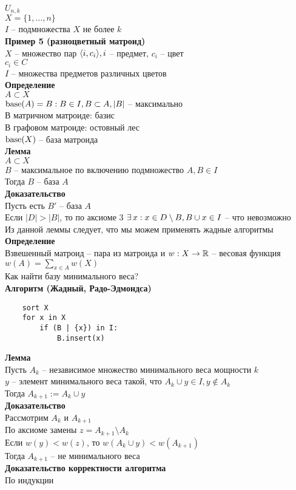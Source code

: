 \documentclass[12pt]{article}
\begin{document}
$U_{n,k}$\\
$X = \{1, \ldots, n\}$\\
$I$ -- подмножества $X$ не более $k$\\
\textbf{Пример 5 (разноцветный матроид)}\\
$X$ -- множество пар $\langle i, c_i \rangle, i$ -- предмет, $c_i$ -- цвет\\
$c_i \in C$\\
$I$ -- множества предметов различных цветов\\
\textbf{Определение}\\
$A \subset X$\\
$\operatorname{base}(A) = B: B\in I, B \subset A, |B|$ -- максимально\\
В матричном матроиде: базис\\
В графовом матроиде: остовный лес\\
$\operatorname{base}(X)$ -- база матроида\\
\textbf{Лемма}\\
$A \subset X$\\
$B$ -- максимальное по включению подмножество $A, B \in I$\\
Тогда $B$ -- база $A$\\
\textbf{Доказательство}\\
Пусть есть $B'$ -- база $A$\\
Если $|D| > |B|$, то по аксиоме 3 $\exists\, x: x \in D\setminus B, B \cup x \in I$ -- что невозможно\\
Из данной леммы следует, что мы можем применять жадные алгоритмы\\
\textbf{Определение}\\
Взвешенный матроид -- пара из матроида и $w: X \rightarrow \mathbb{R}$ -- весовая функция\\
$w(A) = \sum_{x\in A}w(X)$\\
Как найти базу минимального веса?\\
\textbf{Алгоритм (Жадный, Радо-Эдмондса)}
\begin{lstlisting}
    sort X
    for x in X
        if (B | {x}) in I:
            B.insert(x)
\end{lstlisting}
\textbf{Лемма}\\
Пусть $A_k$ -- независимое множество минимального веса мощности $k$\\
$y$ -- элемент минимального веса такой, что $A_k \cup y \in I, y\not\in A_k$\\
Тогда $A_{k+1} := A_k \cup y$\\
\textbf{Доказательство}\\
Рассмотрим $A_k$ и $A_{k+1}$\\
По аксиоме замены $z = A_{k+1} \setminus A_k$\\
Если $w(y) < w(z)$, то $w(A_k \cup y) < w(A_{k+1})$\\
Тогда $A_{k+1}$ -- не минимального веса\\
\textbf{Доказательство корректности алгоритма}\\
По индукции
\end{document}
